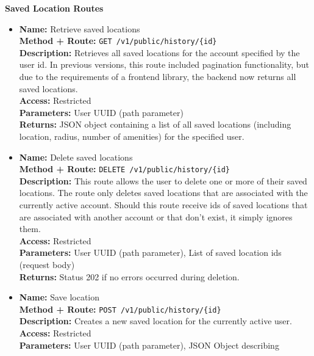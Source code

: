 \begin{itemize}
{    \textbf{Saved Location Routes}
    \begin{itemize}
      \item {
        \textbf{Name:} Retrieve saved locations\\
        \textbf{Method + Route:} \texttt{GET /v1/public/history/\{id\}}\\
        \textbf{Description:} Retrieves all saved locations for the account
        specified by the user id. In previous versions, this route included
        pagination functionality, but due to the requirements of a frontend
        library, the backend now returns all saved locations.\\
        \textbf{Access:} Restricted\\
        \textbf{Parameters:} User UUID (path parameter)\\
        \textbf{Returns:} JSON object containing a list of all saved locations
        (including location, radius, number of amenities) for the specified
        user.\\
      }
      \item {
        \textbf{Name:} Delete saved locations\\
        \textbf{Method + Route:} \texttt{DELETE /v1/public/history/\{id\}}\\
        \textbf{Description:} This route allows the user to delete one or more
        of their saved locations. The route only deletes saved locations that
        are associated with the currently active account. Should this route
        receive ids of saved locations that are associated with another account
        or that don't exist, it simply ignores them.\\
        \textbf{Access:} Restricted\\
        \textbf{Parameters:} User UUID (path parameter), List of saved location
        ids (request body)\\
        \textbf{Returns:} Status 202 if no errors occurred during deletion.\\
      }
      \item {
        \textbf{Name:} Save location\\
        \textbf{Method + Route:} \texttt{POST /v1/public/history/\{id\}}\\
        \textbf{Description:} Creates a new saved location for the currently
        active user.\\
        \textbf{Access:} Restricted\\
        \textbf{Parameters:} User UUID (path parameter), JSON Object describing
}
\end{itemize}}
\end{itemize}
